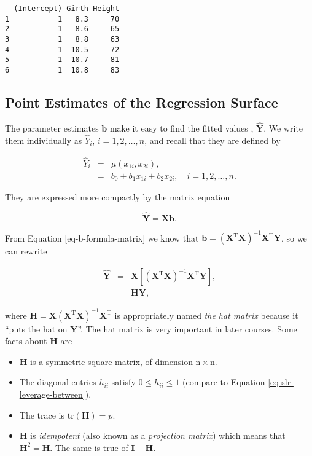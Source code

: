 \documentclass[]{book}
\providecommand{\tightlist}{%
  \setlength{\itemsep}{0pt}\setlength{\parskip}{0pt}}
\numberwithin{equation}{chapter}
\numberwithin{figure}{chapter}
\theoremstyle{plain}
\theoremstyle{definition}
\theoremstyle{remark}
\theoremstyle{definition}
\theoremstyle{definition}
\theoremstyle{remark}
\begin{document}
\begin{verbatim}
  (Intercept) Girth Height
1           1   8.3     70
2           1   8.6     65
3           1   8.8     63
4           1  10.5     72
5           1  10.7     81
6           1  10.8     83
\end{verbatim}

\subsection{Point Estimates of the Regression
Surface}\label{sub-mlr-point-est-regsurface}

The parameter estimates \(\mathbf{b}\) make it easy to find the fitted
values , \(\hat{\mathbf{Y}}\). We write them
individually as \(\hat{Y}_{i}\), \(i=1,2,\ldots,n\), and recall that
they are defined by

\begin{eqnarray}
\hat{Y}_{i} & = & \hat{\mu}(x_{1i},x_{2i}),\\
 & = & b_{0}+b_{1}x_{1i}+b_{2}x_{2i},\quad i=1,2,\ldots,n.
\end{eqnarray}

They are expressed more compactly by the matrix equation

\begin{equation}
\hat{\mathbf{Y}}=\mathbf{X}\mathbf{b}.
\end{equation}

From Equation \eqref{eq-b-formula-matrix} we know that
\(\mathbf{b}=\left(\mathbf{X}^{\mathrm{T}}\mathbf{X}\right)^{-1}\mathbf{X}^{\mathrm{T}}\mathbf{Y}\),
so we can rewrite

\begin{eqnarray}
\hat{\mathbf{Y}} & = & \mathbf{X}\left[\left(\mathbf{X}^{\mathrm{T}}\mathbf{X}\right)^{-1}\mathbf{X}^{\mathrm{T}}\mathbf{Y}\right],\\
 & = & \mathbf{H}\mathbf{Y},
\end{eqnarray}

where
\(\mathbf{H}=\mathbf{X}\left(\mathbf{X}^{\mathrm{T}}\mathbf{X}\right)^{-1}\mathbf{X}^{\mathrm{T}}\)
is appropriately named \emph{the hat matrix}  because
it ``puts the hat on \(\mathbf{Y}\)''. The hat matrix is very important
in later courses. Some facts about \(\mathbf{H}\) are

\begin{itemize}
\tightlist
\item
  \(\mathbf{H}\) is a symmetric square matrix, of dimension
  \(\mathrm{n}\times\mathrm{n}\).
\item
  The diagonal entries \(h_{ii}\) satisfy \(0\leq h_{ii}\leq1\) (compare
  to Equation \eqref{eq-slr-leverage-between}).
\item
  The trace is \(\mathrm{tr}(\mathbf{H})=p\).
\item
  \(\mathbf{H}\) is \emph{idempotent} (also known as a \emph{projection
  matrix}) which means that \(\mathbf{H}^{2}=\mathbf{H}\). The same is
  true of \(\mathbf{I}-\mathbf{H}\).
\end{itemize}
\end{document}
